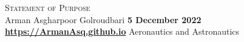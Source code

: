 \documentclass[a4,25pt]{article}
\def\Vrulefill#1#2{
    \vspace{-10pt}
    \leavevmode%
    \leaders%
    \vtop{\hsize=.0025in\vskip#1#2}%
    \hfill%
    \vspace{-2pt}
}
\begin{document}
{{\huge \scshape Statement of Purpose}}\\
\large{Arman Asgharpoor Golroudbari} \hfill { \small \textbf{5 December 2022}} \\

\href{https://ArmanAsq.github.io}{\textbf{\small{https://ArmanAsq.github.io}}}
\hfill {Aeronautics and Astronautics}\\

\Vrulefill{-.05in}{-}
\justifying
\end{document}
